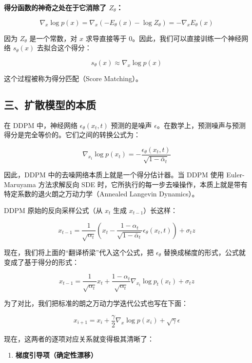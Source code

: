 \textbf{得分函数的神奇之处在于它消除了 \(Z_\theta\)：}

\[
\nabla_x\log p(x)=\nabla_x(-E_\theta(x)-\log Z_\theta)=-\nabla_x E_\theta(x)
\]

因为 \(Z_\theta\) 是一个常数，对 \(x\) 求导直接等于 0。因此，我们可以直接训练一个神经网络 \(s_\theta(x)\) 去拟合这个得分：

\[
s_\theta(x)\approx\nabla_x\log p(x)
\]

这个过程被称为得分匹配（Score Matching）。

\hypertarget{ux4e09ux6269ux6563ux6a21ux578bux7684ux672cux8d28}{%
\subsection{三、扩散模型的本质}\label{ux4e09ux6269ux6563ux6a21ux578bux7684ux672cux8d28}}

在 DDPM 中，神经网络 \(\epsilon_\theta(x_t,t)\) 预测的是噪声 \(\epsilon\)。在数学上，预测噪声与预测得分是完全等价的。它们之间的转换公式为：

\[
\nabla_{x_t}\log p(x_t)=-\frac{\epsilon_\theta(x_t,t)}{\sqrt{1-\bar{\alpha}_t}}
\]

因此，DDPM 中的去噪网络本质上就是一个得分估计器。当 DDPM 使用 Euler-Maruyama 方法求解反向 SDE 时，它所执行的每一步去噪操作，本质上就是带有特定系数的退火朗之万动力学（Annealed Langevin Dynamics）。

DDPM 原始的反向采样公式（从 \(x_t\) 生成 \(x_{t-1}\)）长这样：

\[
x_{t-1}=\frac{1}{\sqrt{\alpha_t}}
\left(x_t-\frac{1-\alpha_t}{\sqrt{1-\bar{\alpha}_t}}\epsilon_\theta(x_t,t)\right)
+\sigma_t z
\]

现在，我们将上面的``翻译桥梁''代入这个公式，把 \(\epsilon_\theta\) 替换成梯度的形式，公式就变成了基于得分的形式：

\[
x_{t-1}=\frac{1}{\sqrt{\alpha_t}}x_t
+\frac{1-\alpha_t}{\sqrt{\alpha_t}}\nabla_{x_t}\log p_t(x_t)
+\sigma_t z
\]

为了对比，我们把标准的朗之万动力学迭代公式也写在下面：

\[
x_{i+1}=x_i+\frac{\gamma}{2}\nabla_x\log p(x_i)+\sqrt{\gamma}\epsilon
\]

现在，这两者的逐项对应关系就变得极其清晰了：

\begin{enumerate}
\def\labelenumi{\arabic{enumi}.}
\tightlist
\item
  \textbf{梯度引导项（确定性漂移）}
\end{enumerate}

